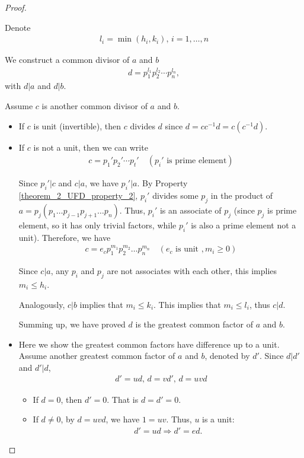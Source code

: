 \documentclass[utf8]{ctexbook}
\theoremstyle{definition}
\begin{document}
\begin{proof}
\begin{enumerate}
{Denote
\begin{align*}
 l_i = \min ( h_i, k_i), \, i = 1, \ldots , n
\end{align*}

We construct a common divisor of $a$ and $b$ 
\begin{align*}
d = p_1 ^{l_1} p_2 ^{l_2} \cdots  p_n ^{l_n} ,
\end{align*}
with $d | a$ and $d | b$.

Assume $c$ is another common divisor of $a$ and $b$.

\begin{itemize}
\item{If $c$ is unit (invertible), then $c$ divides $d$ since $d = c c^{-1} d = c (c^{-1} d)$.}
\item{If $c$ is not a unit, then we can write
\begin{align*}
c = p_1 ' p_2 ' \cdots p_t ' \quad (p_i ' \mbox{ is prime element})
\end{align*}

Since $p_i ' | c$ and $c|a$, we have $p_i ' | a$. By Property \ref{theorem_2_UFD_property_2}, $p_i '$ divides some $p_j$ in the product of $a = p_j (p_1 \ldots p_{j-1} p_{j+1} \ldots p_n ) $. Thus, $p_i '$ is an associate of $p_j$ (since $p_j$ is prime element, so it has only trivial factors, while $p_i '$ is also a prime element not a unit). Therefore, we have
\begin{align*}
c = e_c p_1 ^{m_1} p_2 ^{m_2} \ldots p_n ^{m_n} \quad (e_c \mbox{ is unit }, m_i \geq 0) 
\end{align*}  

Since $c | a$, any $p_i$ and $p_j$ are not associates with each other, this implies $m_i \leq h_i$.

Analogously, $c | b$ implies that $m_i \leq k_i$. This implies that $m_i \leq l_i$, thus $c | d$.

Summing up, we have proved $d$ is the greatest common factor of $a$ and $b$.
}
\item{Here we show the greatest common factors have difference up to a unit. Assume another greatest common factor of $a$ and $b$, denoted by $d'$. Since $d | d'$ and $d' | d$, 
\begin{align*}
d' = u d, \, d = v d', \, d = uv d
\end{align*}

\begin{itemize}
\item{If $d = 0 $, then $d' = 0$. That is $d = d' =0$.
}
\item{If $d \neq 0$, by $d = uv d$, we have $ 1 = u v$. Thus, $u$ is a unit:
\begin{align*}
d' = u d \Longrightarrow d' = e d .
\end{align*}
}
\end{itemize}

}
\end{itemize}


}
\end{enumerate}

\end{proof}
\end{document}
